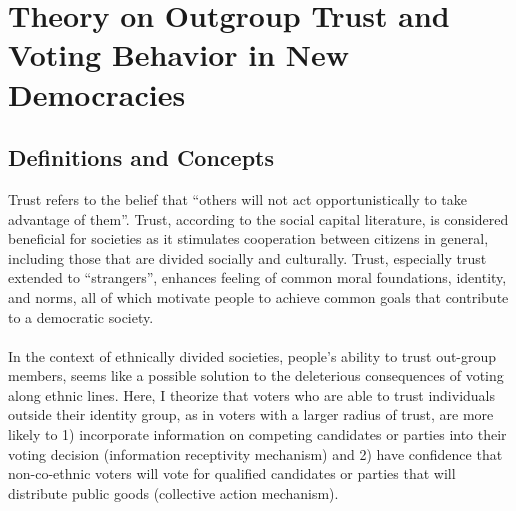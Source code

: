 \documentclass[a4paper, 12pt]{article}
\begin{document}
\section{Theory on Outgroup Trust and Voting Behavior in New Democracies}
\subsection{Definitions and Concepts}
Trust refers to the belief that “others will not act opportunistically to take advantage of them”\cite{keeferSocialTrustElectoral2019}. Trust, according to the social capital literature, is considered beneficial for societies as it stimulates cooperation between citizens in general, including those that are divided socially and culturally\cite{bigelowDemocracyAmericaVolume1899, uslanerMoralFoundationsTrust2002}. Trust, especially trust extended to “strangers”, enhances feeling of common moral foundations, identity, and norms, all of which motivate people to achieve common goals that contribute to a democratic society\cite{putnamBowlingAloneAmerica2000, oskarssonGeneralizedTrustPolitical2010}.
\paragraph{}
In the context of ethnically divided societies, people’s ability to trust out-group members, seems like a possible solution to the deleterious consequences of voting along ethnic lines. Here, I theorize that voters who are able to trust individuals outside their identity group, as in voters with a larger radius of trust, are more likely to 1) incorporate information on competing candidates or parties into their voting decision (information receptivity mechanism) and 2) have confidence that non-co-ethnic voters will vote for qualified candidates or parties that will distribute public goods (collective action mechanism).
\end{document}
